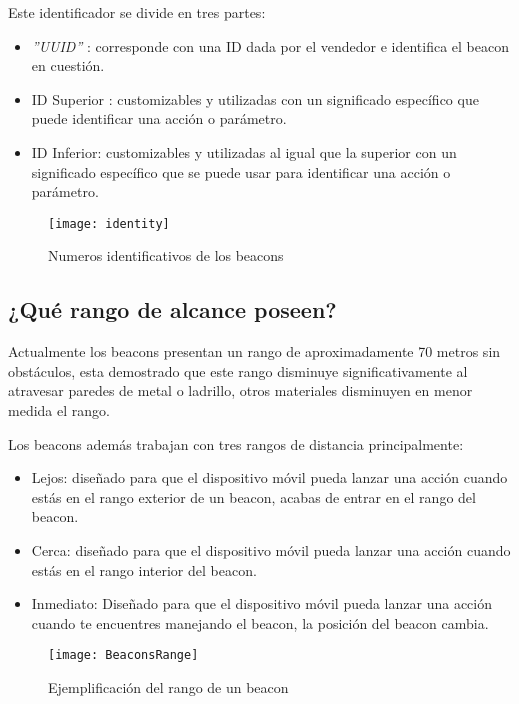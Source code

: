 Este identificador se divide en tres partes: 

\begin{itemize}
\item \textit{''UUID''} \cite{URL::UUID} : corresponde con una ID dada por el vendedor e identifica el beacon en cuestión.
\item ID Superior : customizables y utilizadas con un significado específico que puede identificar una acción o parámetro. 
\item ID Inferior: customizables y utilizadas al igual que la superior con un significado específico que se puede usar para identificar una acción o parámetro.
\end{itemize}

\begin{figure}[h]
	\centering
	\texttt{[image: identity]}
	\caption{Numeros identificativos de los beacons}
	\label{fig:beaconId}
\end{figure}

\subsection{¿Qué rango de alcance poseen?}

Actualmente los beacons presentan un rango de aproximadamente 70 metros sin obstáculos, esta demostrado que este rango disminuye significativamente al atravesar paredes de metal o ladrillo, otros materiales disminuyen en menor medida el rango. 

Los beacons además trabajan con tres rangos de distancia principalmente: 

\begin{itemize}
\item Lejos: diseñado para que el dispositivo móvil pueda lanzar una acción cuando estás en el rango exterior de un beacon, acabas de entrar en el rango del beacon.
\item Cerca: diseñado para que el dispositivo móvil pueda lanzar una acción cuando estás en el rango interior del beacon. 
\item Inmediato: Diseñado para que el dispositivo móvil pueda lanzar una acción cuando te encuentres manejando el beacon, la posición del beacon cambia.
\end{itemize}

\begin{figure}[h]
	\centering
	\texttt{[image: BeaconsRange]}
	\caption{Ejemplificación del rango de un beacon}
	\label{fig:beaconRange}
\end{figure}

